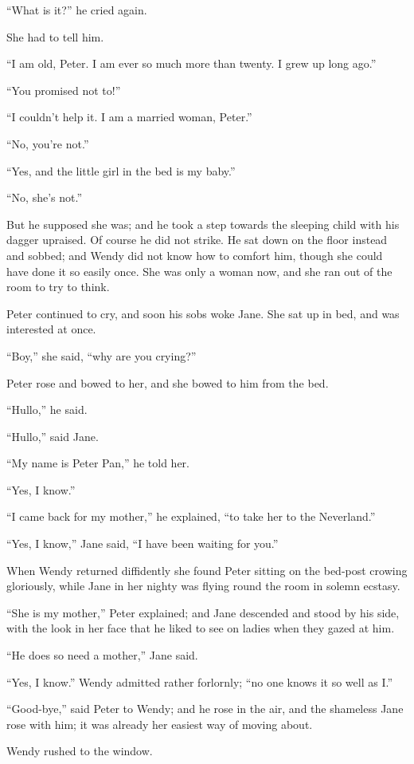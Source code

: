 “What is it?\@” he cried again.

She had to tell him.

“I am old, Peter.
I am ever so much more than twenty.
I grew up long ago.”

“You promised not to!”

“I couldn’t help it.
I am a married woman, Peter.”

“No, you’re not.”

“Yes, and the little girl in the bed is my baby.”

“No, she’s not.”

But he supposed she was;
and he took a step towards the sleeping child with his dagger upraised.
Of course he did not strike.
He sat down on the floor instead and sobbed;
and Wendy did not know how to comfort him,
though she could have done it so easily once.
She was only a woman now, and she ran out of the room to try to think.

Peter continued to cry, and soon his sobs woke Jane.
She sat up in bed, and was interested at once.

“Boy,” she said, “why are you crying?”

Peter rose and bowed to her, and she bowed to him from the bed.

“Hullo,” he said.

“Hullo,” said Jane.

“My name is Peter Pan,” he told her.

“Yes, I know.”

“I came back for my mother,” he explained,
“to take her to the Neverland.”

“Yes, I know,” Jane said, “I have been waiting for you.”

When Wendy returned diffidently
she found Peter sitting on the bed-post crowing gloriously,
while Jane in her nighty was flying round the room in solemn ecstasy.

“She is my mother,” Peter explained;
and Jane descended and stood by his side,
with the look in her face that he liked to see on ladies when they gazed at him.

“He does so need a mother,” Jane said.

“Yes, I know.”
Wendy admitted rather forlornly;
“no one knows it so well as I\@.”

“Good-bye,” said Peter to Wendy;
and he rose in the air, and the shameless Jane rose with him;
it was already her easiest way of moving about.

Wendy rushed to the window.

